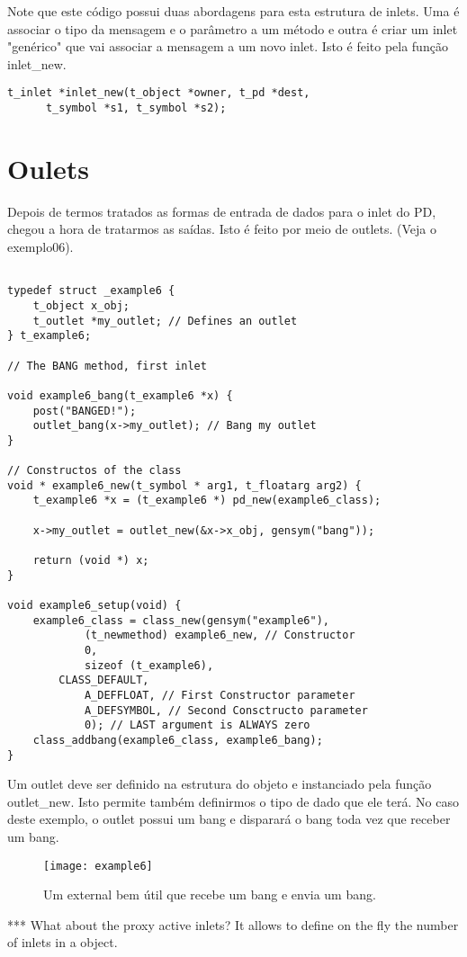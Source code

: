 Note que este código possui duas abordagens para esta estrutura de inlets. Uma
é associar o tipo da mensagem e o parâmetro a um método e outra é criar um
inlet "genérico" que vai associar a mensagem a um novo inlet. Isto é feito pela
função inlet\_new.

\begin{lstlisting}
t_inlet *inlet_new(t_object *owner, t_pd *dest,
      t_symbol *s1, t_symbol *s2);
\end{lstlisting}

\section{Oulets}

Depois de termos tratados as formas de entrada de dados para o inlet do PD,
chegou a hora de tratarmos as saídas. Isto é feito por meio de outlets. (Veja o
exemplo06).

\begin{lstlisting}

typedef struct _example6 {
    t_object x_obj;
    t_outlet *my_outlet; // Defines an outlet
} t_example6;

// The BANG method, first inlet

void example6_bang(t_example6 *x) {
    post("BANGED!");
    outlet_bang(x->my_outlet); // Bang my outlet
}

// Constructos of the class
void * example6_new(t_symbol * arg1, t_floatarg arg2) {
    t_example6 *x = (t_example6 *) pd_new(example6_class);

    x->my_outlet = outlet_new(&x->x_obj, gensym("bang"));

    return (void *) x;
}

void example6_setup(void) {
    example6_class = class_new(gensym("example6"),
            (t_newmethod) example6_new, // Constructor
            0, 
            sizeof (t_example6),
	    CLASS_DEFAULT,
            A_DEFFLOAT, // First Constructor parameter
            A_DEFSYMBOL, // Second Consctructo parameter
            0); // LAST argument is ALWAYS zero
    class_addbang(example6_class, example6_bang);
}
\end{lstlisting}

Um outlet deve ser definido na estrutura do objeto e instanciado pela função
outlet\_new. Isto permite também definirmos o tipo de dado que ele terá. No
caso deste exemplo, o outlet possui um bang e disparará o bang toda vez que
receber um bang.

\begin{figure}[h!]
	\centering
	\texttt{[image: example6]}
	\caption{Um external bem útil que recebe um bang e envia um bang.}
\end{figure}


*** What about the proxy active inlets? It allows to define on the fly the
number of inlets in a object.


